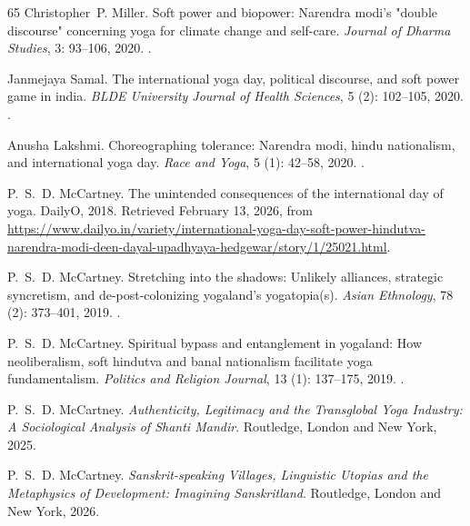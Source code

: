 \documentclass[11pt]{article}
\begin{document}
\begin{thebibliography}{65}
Christopher~P. Miller.
\newblock Soft power and biopower: Narendra modi's "double discourse"
  concerning yoga for climate change and self-care.
\newblock \emph{Journal of Dharma Studies}, 3: 93--106, 2020.
\newblock {}.

Janmejaya Samal.
\newblock The international yoga day, political discourse, and soft power game
  in india.
\newblock \emph{BLDE University Journal of Health Sciences}, 5
  (2): 102--105, 2020.
\newblock {}.

Anusha Lakshmi.
\newblock Choreographing tolerance: Narendra modi, hindu nationalism, and
  international yoga day.
\newblock \emph{Race and Yoga}, 5 (1): 42--58, 2020.
\newblock {}.

P.~S.~D. McCartney.
\newblock The unintended consequences of the international day of yoga.
\newblock DailyO, 2018.
\newblock Retrieved February 13, 2026, from
  \url{https://www.dailyo.in/variety/international-yoga-day-soft-power-hindutva-narendra-modi-deen-dayal-upadhyaya-hedgewar/story/1/25021.html}.

P.~S.~D. McCartney.
\newblock Stretching into the shadows: Unlikely alliances, strategic
  syncretism, and de-post-colonizing yogaland's yogatopia(s).
\newblock \emph{Asian Ethnology}, 78 (2): 373--401,
  2019{}.
\newblock {}.

P.~S.~D. McCartney.
\newblock Spiritual bypass and entanglement in yogaland: How neoliberalism,
  soft hindutva and banal nationalism facilitate yoga fundamentalism.
\newblock \emph{Politics and Religion Journal}, 13 (1):
  137--175, 2019{}.
\newblock {}.

P.~S.~D. McCartney.
\newblock \emph{Authenticity, Legitimacy and the Transglobal Yoga Industry: A
  Sociological Analysis of Shanti Mandir}.
\newblock Routledge, London and New York, 2025.

P.~S.~D. McCartney.
\newblock \emph{Sanskrit-speaking Villages, Linguistic Utopias and the
  Metaphysics of Development: Imagining Sanskritland}.
\newblock Routledge, London and New York, 2026.


\end{thebibliography}
\end{document}

